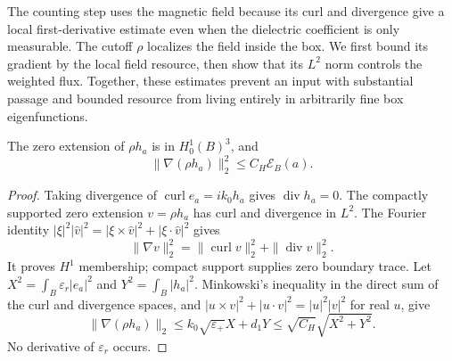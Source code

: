 The counting step uses the magnetic field because its curl and divergence
give a local first-derivative estimate even when the dielectric coefficient
is only measurable.  The cutoff $\rho$ localizes the field inside the box.
We first bound its gradient by the local field resource, then show that its
$L^2$ norm controls the weighted flux.  Together, these estimates prevent an
input with substantial passage and bounded resource from living entirely in
arbitrarily fine box eigenfunctions.

\begin{lemma}
\label{ch:magneticHone}
The zero extension of $\rho h_a$ is in $H^1_0(B)^3$, and
\begin{equation}
 \|\nabla(\rho h_a)\|_2^2\leq C_H\mathcal E_B(a).
 \label{ch:Honebound}
\end{equation}
\end{lemma}
\begin{proof}
Taking divergence of $\operatorname{curl}e_a=ik_0h_a$ gives
$\operatorname{div}h_a=0$.  The compactly supported zero extension
$v=\rho h_a$ has curl and divergence in $L^2$.  The Fourier identity
$|\xi|^2|\widehat v|^2=|\xi\times\widehat v|^2+
|\xi\cdot\widehat v|^2$ gives
\begin{equation}
 \|\nabla v\|_2^2=\|\operatorname{curl}v\|_2^2+
 \|\operatorname{div}v\|_2^2.
 \label{ch:divcurl}
\end{equation}
It proves $H^1$ membership; compact support supplies zero boundary trace.
Let $X^2=\int_B\varepsilon_r|e_a|^2$ and $Y^2=\int_B|h_a|^2$.
Minkowski's inequality in the direct sum of the curl and divergence spaces,
and $|u\times v|^2+|u\cdot v|^2=|u|^2|v|^2$ for real $u$, give
\begin{equation}
 \|\nabla(\rho h_a)\|_2
 \leq k_0\sqrt{\varepsilon_+}X+d_1Y
 \leq\sqrt{C_H}\sqrt{X^2+Y^2}.
 \label{ch:Honeproof}
\end{equation}
No derivative of $\varepsilon_r$ occurs.
\end{proof}


